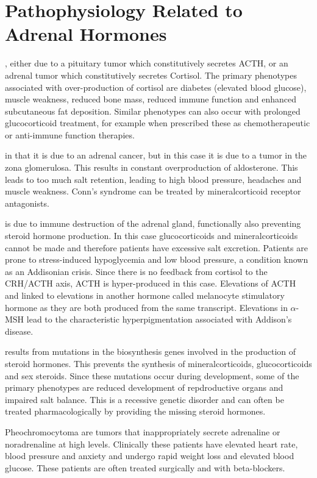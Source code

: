 \documentclass{tufte-handout}
\begin{document}
\section{Pathophysiology Related to Adrenal Hormones}

, either due to a pituitary tumor which constitutively secretes ACTH, or an adrenal tumor which constitutively secretes Cortisol.  The primary phenotypes associated with over-production of cortisol are diabetes (elevated blood glucose), muscle weakness, reduced bone mass, reduced immune function and enhanced subcutaneous fat deposition.  Similar phenotypes can also occur with prolonged glucocorticoid treatment, for example when prescribed these as chemotherapeutic or anti-immune function therapies.

 in that it is due to an adrenal cancer, but in this case it is due to a tumor in the zona glomerulosa.  This results in constant overproduction of aldosterone.  This leads to too much salt retention, leading to high blood pressure, headaches and muscle weakness.  Conn's syndrome can be treated by mineralcorticoid receptor antagonists.

 is due to immune destruction of the adrenal gland, functionally also preventing steroid hormone production.  In this case glucocorticoids and mineralcorticoids cannot be made and therefore patients have excessive salt excretion.  Patients are prone to stress-induced hypoglycemia and low blood pressure, a condition known as an Addisonian crisis.  Since there is no feedback from cortisol to the CRH/ACTH axis, ACTH is hyper-produced in this case.  Elevations of ACTH and linked to elevations in another hormone called melanocyte stimulatory hormone as they are both produced from the same transcript.  Elevations in $\alpha$-MSH lead to the characteristic hyperpigmentation associated with Addison's disease. 

 results from mutations in the biosynthesis genes involved in the production of steroid hormones.  This prevents the synthesis of mineralcorticoids, glucocorticoids and sex steroids.  Since these mutations occur during development, some of the primary phenotypes are reduced development of repdroductive organs and impaired salt balance.  This is a recessive genetic disorder and can often be treated pharmacologically by providing the missing steroid hormones.


Pheochromocytoma are tumors that inappropriately secrete adrenaline or noradrenaline at high levels.  Clinically these patients have elevated heart rate, blood pressure and anxiety and undergo rapid weight loss and elevated blood glucose.  These patients are often treated surgically and with beta-blockers.
\listoffigures
\listoftables



\end{document}
